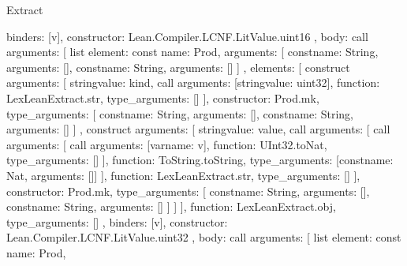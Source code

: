 \begin{lexlean}{Extract}
\begin{toolingmodule}
{{{{            binders: [v],
            constructor: Lean.Compiler.LCNF.LitValue.uint16
          },
          {
            body: call{
              arguments: [
                list{
                  element: const{
                    name: Prod,
                    arguments: [
                      const{name: String, arguments: []},
                      const{name: String, arguments: []}
                    ]
                  },
                  elements: [
                    construct{
                      arguments: [
                        string{value: kind},
                        call{
                          arguments: [string{value: uint32}],
                          function: LexLeanExtract.str,
                          type_arguments: []
                        }
                      ],
                      constructor: Prod.mk,
                      type_arguments: [
                        const{name: String, arguments: []},
                        const{name: String, arguments: []}
                      ]
                    },
                    construct{
                      arguments: [
                        string{value: value},
                        call{
                          arguments: [
                            call{
                              arguments: [
                                call{
                                  arguments: [var{name: v}],
                                  function: UInt32.toNat,
                                  type_arguments: []
                                }
                              ],
                              function: ToString.toString,
                              type_arguments: [const{name: Nat, arguments: []}]
                            }
                          ],
                          function: LexLeanExtract.str,
                          type_arguments: []
                        }
                      ],
                      constructor: Prod.mk,
                      type_arguments: [
                        const{name: String, arguments: []},
                        const{name: String, arguments: []}
                      ]
                    }
                  ]
                }
              ],
              function: LexLeanExtract.obj,
              type_arguments: []
            },
            binders: [v],
            constructor: Lean.Compiler.LCNF.LitValue.uint32
          },
          {
            body: call{
              arguments: [
                list{
                  element: const{
                    name: Prod,
}}}}}}}
\end{toolingmodule}
\end{lexlean}
